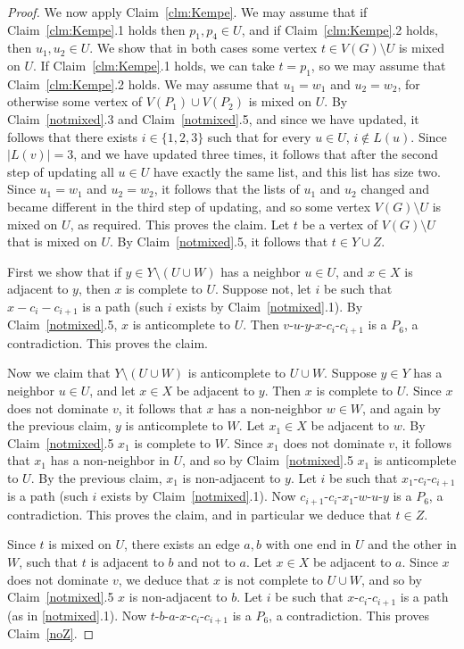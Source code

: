 \documentclass[11pt]{article}
\begin{document}
\begin{proof}
We now apply Claim~\ref{clm:Kempe}. We may assume that if Claim~\ref{clm:Kempe}.1
holds then $p_1,p_4 \in U$, and if Claim~\ref{clm:Kempe}.2 holds,
then $u_1,u_2 \in U$. We show that in both cases some vertex
$t \in V(G) \setminus U$   is  mixed on  $U$. If Claim~\ref{clm:Kempe}.1
holds, we can take $t=p_1$, so we may assume that Claim~\ref{clm:Kempe}.2
holds.  We may assume that $u_1=w_1$ and $u_2=w_2$, for otherwise
some vertex of $V(P_1) \cup V(P_2)$  is mixed on $U$.
By Claim~\ref{notmixed}.3 and Claim~\ref{notmixed}.5, and since we 
have updated,  
it  follows that there exists $i \in \{1,2,3\}$ such that for every $u \in U$,
$i \not \in L(u)$.
Since $|L(v)|=3$, and we have updated three times, it follows that
after the second step of updating all $u \in U$ have exactly the same list, 
and this list has size two.
Since $u_1=w_1$ and $u_2=w_2$, it follows that the lists of $u_1$ and $u_2$
changed and became different in the third step of updating, and so some vertex 
$V(G) \setminus U$ is mixed on $U$, as required. This proves the claim.
Let $t$ be  a vertex of $V(G) \setminus U$ that is mixed on $U$.
By Claim~\ref{notmixed}.5, it  follows that $t \in Y \cup Z$.


First we show that if $y \in Y \setminus (U \cup W)$ has a neighbor
$u \in U$, and $x \in X$ is adjacent to $y$, then $x$ is complete to 
$U$. Suppose not, let $i$ be such that
$x-c_i-c_{i+1}$ is a path (such $i$ exists by Claim~\ref{notmixed}.1).
By Claim~\ref{notmixed}.5, $x$ is anticomplete to $U$.
Then $v$-$u$-$y$-$x$-$c_i$-$c_{i+1}$ is a $P_6$, a contradiction. This proves the claim.

Now we claim that $Y \setminus (U \cup W)$ is anticomplete to $U \cup W$.
Suppose $y \in Y$ has a neighbor $u \in U$, and let $x \in X$ be adjacent
to $y$. Then $x$ is complete to $U$. Since $x$ does not
dominate $v$, it follows that $x$ has a non-neighbor $w \in W$, and 
again by the previous claim, $y$ is anticomplete to $W$. 
Let $x_1 \in X$ be adjacent to $w$. By Claim~\ref{notmixed}.5
$x_1$ is complete to $W$. Since $x_1$ does not dominate $v$, it
follows that $x_1$ has a non-neighbor in $U$, and so by Claim~\ref{notmixed}.5
$x_1$ is anticomplete to $U$. By the previous claim,
$x_1$ is non-adjacent to $y$. Let $i$ be such that
$x_1$-$c_i$-$c_{i+1}$ is a path (such $i$ exists by Claim~\ref{notmixed}.1).
Now $c_{i+1}$-$c_i$-$x_1$-$w$-$u$-$y$ is a $P_6$, a contradiction. This proves the claim,
and in particular we deduce that $t \in Z$.

Since $t$ is mixed on $U$, there exists an edge 
$a,b$ with one end in $U$ and the other in $W$, such that
$t$ is adjacent to $b$ and not to $a$. Let $x \in X$ be adjacent to 
$a$. Since $x$ does not dominate $v$, we deduce that $x$ is not complete to 
$U \cup W$, and so by Claim~\ref{notmixed}.5 $x$ is non-adjacent to $b$.
Let $i$ be such that $x$-$c_i$-$c_{i+1}$ is a path (as in \ref{notmixed}.1).
Now $t$-$b$-$a$-$x$-$c_i$-$c_{i+1}$ is a $P_6$, a contradiction.
This proves Claim~\ref{noZ}.
\end{proof}
\end{document}
